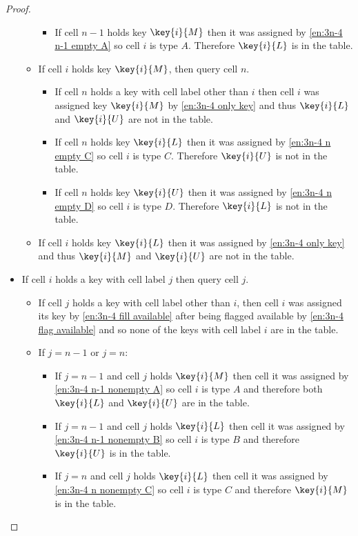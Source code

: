 \begin{proof}
\begin{itemize}
\begin{itemize}
\begin{itemize}
						\item If cell $n-1$ holds key $\key{i}{M}$ then it was assigned by \ref{en:3n-4 n-1 empty A} so cell $i$ is type $A$. Therefore $\key{i}{L}$ is in the table.
					\end{itemize}
				\item If cell $i$ holds key $\key{i}{M}$, then query cell $n$.
					\begin{itemize}
						\item If cell $n$ holds a key with cell label other than $i$ then cell $i$ was assigned key $\key{i}{M}$ by \ref{en:3n-4 only key} and thus $\key{i}{L}$ and $\key{i}{U}$ are not in the table.
						\item If cell $n$ holds key $\key{i}{L}$ then it was assigned by \ref{en:3n-4 n empty C} so cell $i$ is type $C$. Therefore $\key{i}{U}$ is not in the table.
						\item If cell $n$ holds key $\key{i}{U}$ then it was assigned by \ref{en:3n-4 n empty D} so cell $i$ is type $D$. Therefore $\key{i}{L}$ is not in the table.
					\end{itemize}
				\item If cell $i$ holds key $\key{i}{L}$ then it was assigned by \ref{en:3n-4 only key} and thus $\key{i}{M}$ and $\key{i}{U}$ are not in the table.
			\end{itemize}
		\item If cell $i$ holds a key with cell label $j$ then query cell $j$.
			\begin{itemize}
				\item If cell $j$ holds a key with cell label other than $i$, then cell $i$ was assigned its key by \ref{en:3n-4 fill available} after being flagged available by \ref{en:3n-4 flag available} and so none of the keys with cell label $i$ are in the table.
				\item If $j=n-1$ or $j=n$:
					\begin{itemize}
						\item If $j=n-1$ and cell $j$ holds $\key{i}{M}$ then cell it was assigned by \ref{en:3n-4 n-1 nonempty A} so cell $i$ is type $A$ and therefore both $\key{i}{L}$ and $\key{i}{U}$ are in the table.
						\item If $j=n-1$ and cell $j$ holds $\key{i}{L}$ then cell it was assigned by \ref{en:3n-4 n-1 nonempty B} so cell $i$ is type $B$ and therefore $\key{i}{U}$ is in the table.
						\item If $j=n$ and cell $j$ holds $\key{i}{L}$ then cell it was assigned by \ref{en:3n-4 n nonempty C} so cell $i$ is type $C$ and therefore $\key{i}{M}$ is in the table.

\end{itemize}
\end{itemize}
\end{itemize}
\end{proof}
